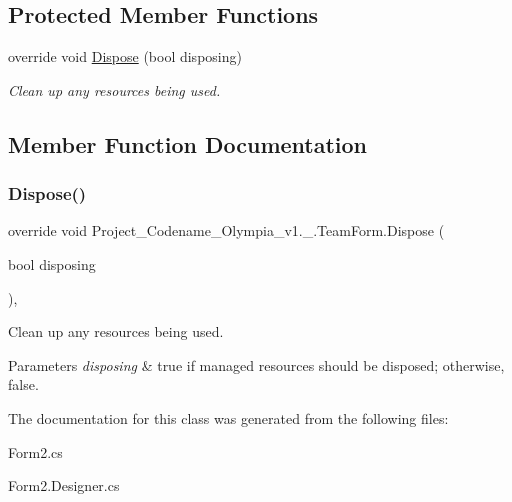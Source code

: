 \subsection*{Protected Member Functions}
\begin{DoxyCompactItemize}
\item 
override void \hyperlink{classProject__Codename__Olympia__v1_1_1__0_1_1TeamForm_a7896ce3551a76d8161138e412e507a17}{Dispose} (bool disposing)
\begin{DoxyCompactList}\small\item\em Clean up any resources being used. \end{DoxyCompactList}\end{DoxyCompactItemize}


\subsection{Member Function Documentation}
\mbox{\label{classProject__Codename__Olympia__v1_1_1__0_1_1TeamForm_a7896ce3551a76d8161138e412e507a17}} 
\subsubsection{\texorpdfstring{Dispose()}{Dispose()}}
{\footnotesize\ttfamily override void Project\+\_\+\+Codename\+\_\+\+Olympia\+\_\+v1.\+\_.\+Team\+Form.\+Dispose (\begin{DoxyParamCaption}\item[{bool}]{disposing }\end{DoxyParamCaption})\hspace{0.3cm}{\ttfamily [inline]}, {\ttfamily [protected]}}



Clean up any resources being used. 


\begin{DoxyParams}{Parameters}
{\em disposing} & true if managed resources should be disposed; otherwise, false.\\
\hline
\end{DoxyParams}


The documentation for this class was generated from the following files\+:\begin{DoxyCompactItemize}
\item 
Form2.\+cs\item 
Form2.\+Designer.\+cs\end{DoxyCompactItemize}
